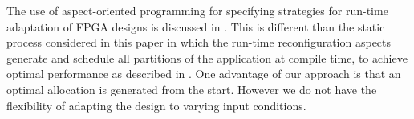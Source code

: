 The use of aspect-oriented programming for specifying strategies for
run-time adaptation of FPGA designs is discussed in
\cite{6322875}. This is different than the static process considered
in this paper in which the run-time reconfiguration aspects generate
and schedule all partitions of the application at compile time, to
achieve optimal performance as described in
\cite{Xinyu:Qiwei:Luk:Qiang:Pell:2012}. One advantage of our approach
is that an optimal allocation is generated from the start. However we
do not have the flexibility of adapting the design to varying input
conditions.
